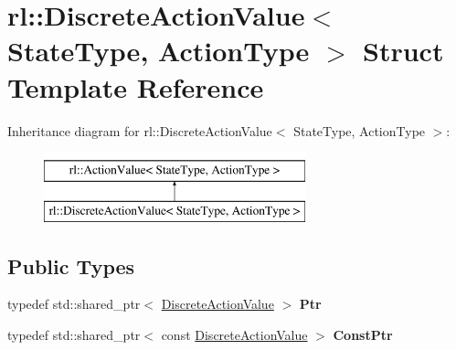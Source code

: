 \hypertarget{structrl_1_1_discrete_action_value}{}\section{rl\+:\+:Discrete\+Action\+Value$<$ State\+Type, Action\+Type $>$ Struct Template Reference}
\label{structrl_1_1_discrete_action_value}
Inheritance diagram for rl\+:\+:Discrete\+Action\+Value$<$ State\+Type, Action\+Type $>$\+:\begin{figure}[H]
\begin{center}
\leavevmode
\includegraphics[height=2.000000cm]{structrl_1_1_discrete_action_value}
\end{center}
\end{figure}
\subsection*{Public Types}
\begin{DoxyCompactItemize}
\item 
\hypertarget{structrl_1_1_discrete_action_value_aff687faeb6bc97d3dcc4fc603af7fa39}{}\label{structrl_1_1_discrete_action_value_aff687faeb6bc97d3dcc4fc603af7fa39} 
typedef std\+::shared\+\_\+ptr$<$ \hyperlink{structrl_1_1_discrete_action_value}{Discrete\+Action\+Value} $>$ {\bfseries Ptr}
\item 
\hypertarget{structrl_1_1_discrete_action_value_a550469f7ce0f9c2fbf06117a16f4c0f8}{}\label{structrl_1_1_discrete_action_value_a550469f7ce0f9c2fbf06117a16f4c0f8} 
typedef std\+::shared\+\_\+ptr$<$ const \hyperlink{structrl_1_1_discrete_action_value}{Discrete\+Action\+Value} $>$ {\bfseries Const\+Ptr}
\end{DoxyCompactItemize}
